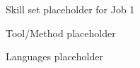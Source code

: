 
\begin{onecolentry}
  \begin{highlights}
    \item Skill set placeholder for Job 1
    \item Tool/Method placeholder
    \item Languages placeholder
  \end{highlights}
\end{onecolentry}
